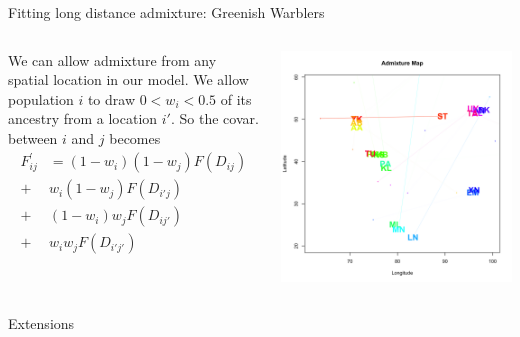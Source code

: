 \documentclass{beamer}
\begin{document}
\begin{frame}{Fitting long distance admixture: Greenish Warblers}

\begin{columns}
\begin{column}{0.4\textwidth}
We can allow admixture from any spatial location in our model. We
allow population $i$ to draw $0<w_i<0.5$ of its ancestry from a
location $i'$. So the covar. between $i$ and $j$ becomes
\begin{align*}
F_{ij}^{\prime}  & = (1-w_i)(1-w_j) F(D_{ij})  \\
+ & w_i(1-w_j)F(D_{i'j})\\
+ & (1-w_i)w_j F(D_{ij'}) \\
+ & w_iw_j F(D_{i'j'})
\end{align*}
\end{column}
\begin{column}{0.6\textwidth}
\pause 

	\begin{center} \includegraphics[width=  0.9 \textwidth]{../smbe_spacemix_figs/procrustes_warbler_admix_map_for_graham_talk}
 \end{center}
\end{column}
\end{columns}
\end{frame}


\begin{frame}{Extensions}

\end{frame}
\end{document}
